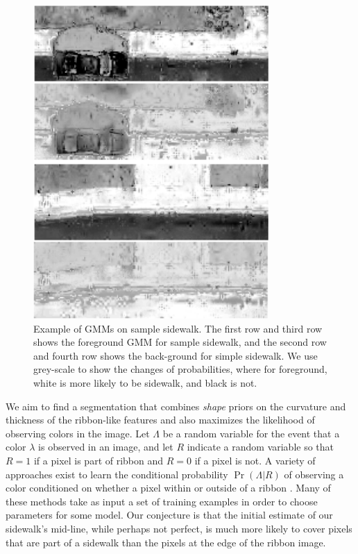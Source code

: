 \begin{figure}[H]
    \centering
    \includegraphics[width=0.8\textwidth]{Figures/GMM_needed.png}
    \caption[\ac{GMM} Result 1]{Example of GMMs on sample sidewalk. The first row and third row shows the foreground GMM for sample sidewalk, and the second row and fourth row shows the back-ground for simple sidewalk. We use grey-scale to show the changes of probabilities, where for foreground, white is more likely to be sidewalk, and black is not.}
    \label{fig:GMM_result}
\end{figure}


We aim to find a segmentation that combines \textit{shape} priors on the curvature and thickness of the ribbon-like features and also maximizes the likelihood of observing colors in the image. 
Let $\Lambda$ be a random variable for the event that a color $\lambda$ is observed in an image, and let $R$ indicate a random variable so that $R=1$ if a pixel is part of ribbon and $R=0$ if a pixel is not. A variety of approaches exist to learn the conditional probability $\Pr(\Lambda|R)$ of observing a color conditioned on whether a pixel within or outside of a ribbon \cite{hartigan1979algorithm, jordan1999introduction}. Many of these methods take as input a set of training examples in order to choose parameters for some model.  Our conjecture is that the initial estimate of our sidewalk's mid-line, while perhaps not perfect, is much more likely to cover pixels that are part of a sidewalk than the pixels at the edge of the ribbon image. 

